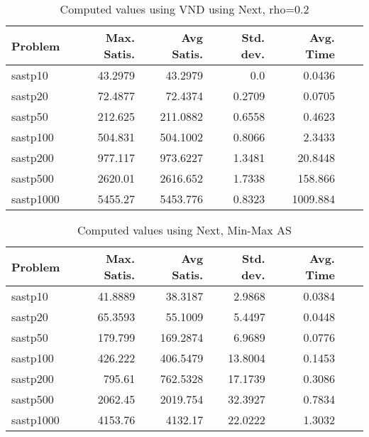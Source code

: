 \documentclass{article}
\begin{document}
\begin{table}[b!]
  \vspace{-6mm}%
  \caption{Computed values using VND using Next, rho=0.2}
  \label{tab:conf4}
  \setlength{\tabcolsep}{1.4mm}
  \centering
  \begin{tabular}{lrrrrrr}
    \bfseries Problem &
    \bfseries Max. Satis. &
    \bfseries Avg Satis. &
    \bfseries Std. dev. &
    \bfseries Avg. Time 
    \\\hline
    sastp10 & 43.2979 & 43.2979 & 0.0 & 0.0436 \\ 
    sastp20 & 72.4877 & 72.4374 & 0.2709 & 0.0705 \\ 
    sastp50 & 212.625 & 211.0882 & 0.6558 & 0.4623 \\ 
    sastp100 & 504.831 & 504.1002 & 0.8066 & 2.3433 \\ 
    sastp200 & 977.117 & 973.6227 & 1.3481 & 20.8448 \\ 
    sastp500 & 2620.01 & 2616.652 & 1.7338 & 158.866 \\ 
    sastp1000 & 5455.27 & 5453.776 & 0.8323 & 1009.884

    \\\hline
  \end{tabular}

\end{table}


\begin{table}[b!]
  \vspace{-6mm}%
  \caption{Computed values using Next, Min-Max AS }
  \label{tab:conf5}
  \setlength{\tabcolsep}{1.4mm}
  \centering
  \begin{tabular}{lrrrrrr}
    \bfseries Problem &
    \bfseries Max. Satis. &
    \bfseries Avg Satis. &
    \bfseries Std. dev. &
    \bfseries Avg. Time 
    \\\hline
   sastp10 & 41.8889 & 38.3187 & 2.9868 & 0.0384 \\ 
   sastp20 & 65.3593 & 55.1009 & 5.4497 & 0.0448 \\ 
   sastp50 & 179.799 & 169.2874 & 6.9689 & 0.0776 \\ 
   sastp100 & 426.222 & 406.5479 & 13.8004 & 0.1453 \\ 
   sastp200 & 795.61 & 762.5328 & 17.1739 & 0.3086 \\ 
   sastp500 & 2062.45 & 2019.754 & 32.3927 & 0.7834 \\ 
   sastp1000 & 4153.76 & 4132.17 & 22.0222 & 1.3032
    \\\hline
  \end{tabular}

\end{table}
\end{document}
